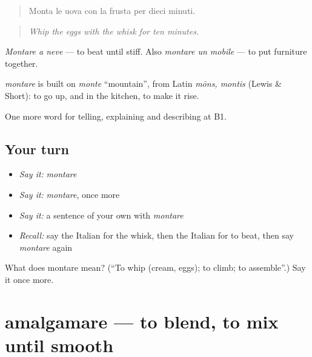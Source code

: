 \begin{quote}
Monta le uova con la frusta per dieci minuti.
\end{quote}

\begin{quote}
\emph{Whip the eggs with the whisk for ten minutes.}
\end{quote}

\emph{Montare a neve} — to beat until stiff. Also \emph{montare un mobile} — to put furniture together.

\begin{cousinweb}
\emph{montare} is built on \emph{monte} \textquotedblleft{}mountain\textquotedblright{}, from Latin \emph{mōns, montis} (Lewis \& Short): to go up, and in the kitchen, to make it rise.
\end{cousinweb}

\begin{grammarlens}[title={What you've built}]
One more word for telling, explaining and describing at B1.
\end{grammarlens}

\subsection*{Your turn}
\begin{itemize}
\raggedright
  \item \emph{Say it:} \emph{montare}
  \item \emph{Say it:} \emph{montare}, once more
  \item \emph{Say it:} a sentence of your own with \emph{montare}
  \item \emph{Recall:} say the Italian for the whisk, then the Italian for to beat, then say \emph{montare} again
\end{itemize}

\begin{tcolorbox}[breakable,colback=teal!4,colframe=teal!35!black,title={Before you move on}]
What does montare mean? (\textquotedblleft{}To whip (cream, eggs); to climb; to assemble\textquotedblright{}.) Say it once more.
\end{tcolorbox}
\section[amalgamare]{amalgamare — to blend, to mix until smooth}

\label{lesson:IT-C338-amalgamare}



